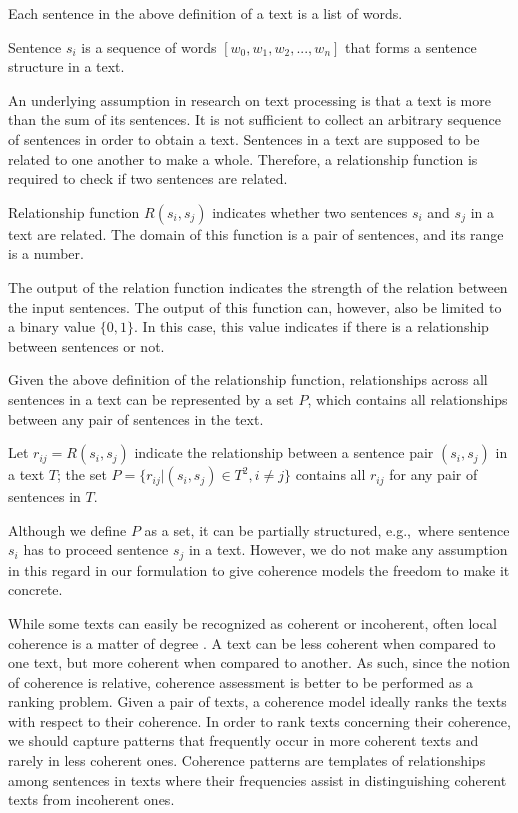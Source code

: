 Each sentence in the above definition of a text is a list of words.

\begin{definition}
Sentence $s_i$ is a sequence of words $[w_0, w_1, w_2, ... , w_n]$ that forms a sentence structure in a text. 
\end{definition}

An underlying assumption in research on text processing is that a text is more than the sum of its sentences. 
It is not sufficient to collect an arbitrary sequence of sentences in order to obtain a text. 
Sentences in a text are supposed to be related to one another to make a whole. 
Therefore, a relationship function is required to check if two sentences are related. 

\begin{definition}
Relationship function $R(s_i,s_j)$ indicates whether two sentences $s_i$ and $s_j$ in a text are related. 
The domain of this function is a pair of sentences, and its range is a number. 
\end{definition} 

The output of the relation function indicates the strength of the relation between the input sentences.  
The output of this function can, however, also be limited to a binary value $\lbrace 0,1\rbrace$. 
In this case, this value indicates if there is a relationship between sentences or not. 

Given the above definition of the relationship function, relationships across all sentences in a text can be represented by a set $P$, which contains all relationships between any pair of sentences in the text. 

\begin{definition}
Let $r_{ij}= R(s_i,s_j)$ indicate the relationship between a sentence pair $(s_i,s_j)$ in a text $T$; the set $P = \lbrace r_{ij}| (s_i,s_j) \in T^2, i \neq j \rbrace$ contains all $r_{ij}$ for any pair of sentences in $T$.
\end{definition}  

Although we define $P$ as a set, it can be partially structured, e.g.,\ where sentence $s_i$ has to proceed sentence $s_j$ in a text. 
However, we do not make any assumption in this regard in our formulation to give coherence models the freedom to make it concrete. 

While some texts can easily be recognized as coherent or incoherent, often local coherence is a matter of degree \cite{halliday76}. 
A text can be less coherent when compared to one text, but more coherent when compared to another. 
As such, since the notion of coherence is relative, coherence assessment is better to be performed as a ranking problem. 
Given a pair of texts, a coherence model ideally ranks the texts with respect to their coherence.
In order to rank texts concerning their coherence, we should capture patterns that frequently occur in more coherent texts and rarely in less coherent ones.  
Coherence patterns are templates of relationships among sentences in texts where their frequencies assist in distinguishing coherent texts from incoherent ones. 

